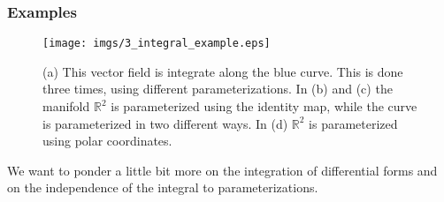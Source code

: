 \subsubsection{Examples}

\begin{figure}%
\texttt{[image: imgs/3\_integral\_example.eps]}%
\caption{(a) This vector field is integrate along the blue curve. This is done three times, using different parameterizations. In (b) and (c) the manifold $\mathbb R^2$ is parameterized using the identity map, while the curve is parameterized in two different ways. In (d) $\mathbb R^2$ is parameterized using polar coordinates.}%
\label{fig::3_integral_example}%
\end{figure}

We want to ponder a little bit more on the integration of differential forms and on the independence of the integral to parameterizations.


